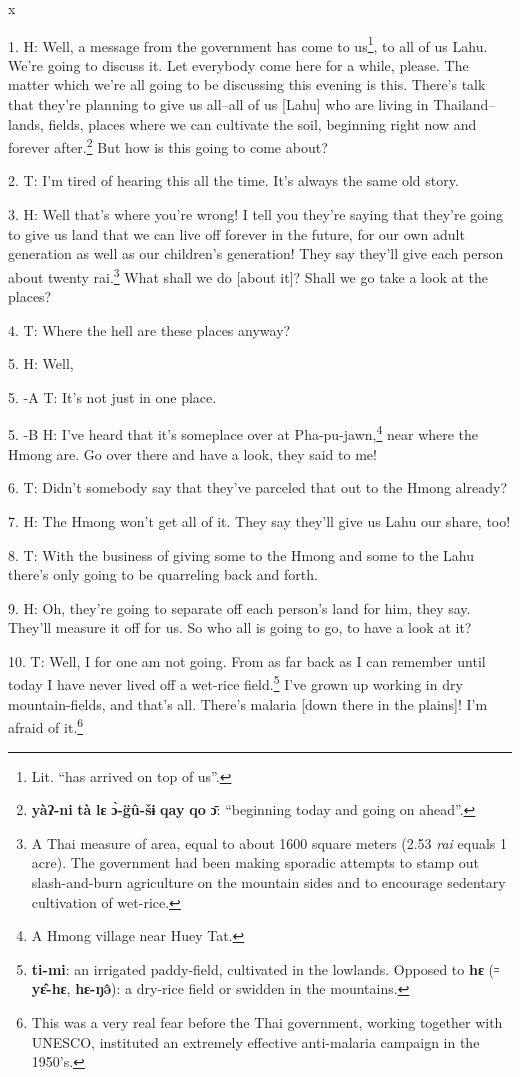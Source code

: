 x\setcounter{footnote}{0}

1. H: Well, a message from the government has come to us\footnote{Lit. ``has arrived on top of us''.}, to all of us Lahu.
We're going to discuss it. Let everybody come here for a while, please. The matter
which we're all going to be discussing this evening is this. There's talk that
they're planning to give us all--all of us [Lahu] who are living in Thailand--lands,
fields, places where we can cultivate the soil, beginning right now and forever
after.\footnote{\textbf{yàʔ-ni} \textbf{tà} \textbf{lɛ} \textbf{ɔ̀-g̈û-šɨ} \textbf{qay} \textbf{qo} \textbf{ɔ̄}: ``beginning today and going on ahead''.} But how is this going to come about?

2. T: I'm tired of hearing this all the time. It's always the same old story.

3. H: Well that's where you're wrong! I tell you they're saying that they're going
to give us land that we can live off forever in the future, for our own adult generation
as well as our children's generation! They say they'll give each person about twenty
rai.\footnote{A Thai measure of area, equal to about 1600 square meters (2.53 \textit{rai}  equals 1 acre). The government had been making sporadic attempts to stamp out slash-and-burn agriculture on the mountain sides and to encourage sedentary cultivation of wet-rice.} What shall we do [about it]? Shall we go take a look at the places?

4. T: Where the hell are these places anyway?

5. H: Well,

5. -A T: It's not just in one place.

5. -B H: I've heard that it's someplace over at Pha-pu-jawn,\footnote{A Hmong village near Huey Tat.} near where the Hmong
are. Go over there and have a look, they said to me!

6. T: Didn't somebody say that they've parceled that out to the Hmong already?

7. H: The Hmong won't get all of it. They say they'll give us Lahu our share, too!

8. T: With the business of giving some to the Hmong and some to the Lahu there's
only going to be quarreling back and forth.

9. H: Oh, they're going to separate off each person's land for him, they say. They'll
measure it off for us. So who all is going to go, to have a look at it?

10. T: Well, I for one am not going. From as far back as I can remember until
today I have never lived off a wet-rice field.\footnote{\textbf{ti-mi}: an irrigated paddy-field, cultivated in the lowlands. Opposed to \textbf{hɛ} (꞊ \textbf{yɛ̂-hɛ}, \textbf{hɛ-ŋə̂}): a dry-rice field or swidden in the mountains.} I've grown up working in dry
mountain-fields, and that's all. There's malaria [down there in the plains]! I'm
afraid of it.\footnote{This was a very real fear before the Thai government, working together with UNESCO, instituted an extremely effective anti-malaria campaign in the 1950's.}

